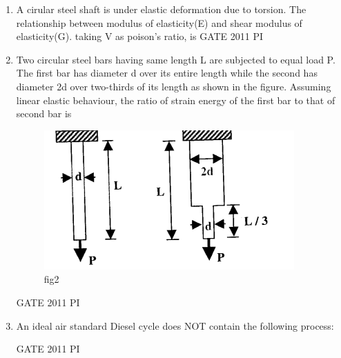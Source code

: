 \documentclass[journal,12pt,onecolumn]{IEEEtran}
\theoremstyle{remark}
\begin{document}
\begin{enumerate}
\item 
A cirular steel shaft is under elastic deformation due to torsion. The relationship between modulus of elasticity(E) and shear modulus of elasticity(G). taking V as poison's ratio, is 
\hfill GATE 2011 PI  

\begin{enumerate}
\end{enumerate}
\item 
Two circular steel bars having same length L are subjected to equal load P. The first bar has diameter d over its entire length while the second has diameter 2d over two-thirds of its length  as shown in the figure. Assuming linear elastic behaviour, the ratio of strain energy of the first bar to that of second bar is

\begin{figure}[H]
    \centering
    \includegraphics[width=0.5\linewidth]{figs/Q.7.png}
    \caption{fig2}
    \label{fig:figs/Q.7.png}
\end{figure}
\hfill{GATE 2011 PI}
\begin{enumerate}
 \end{enumerate}
 \item An ideal air standard Diesel cycle does NOT contain the following process:  

\hfill GATE 2011 PI  

\begin{enumerate}
\end{enumerate}


\end{enumerate}
\end{document}
